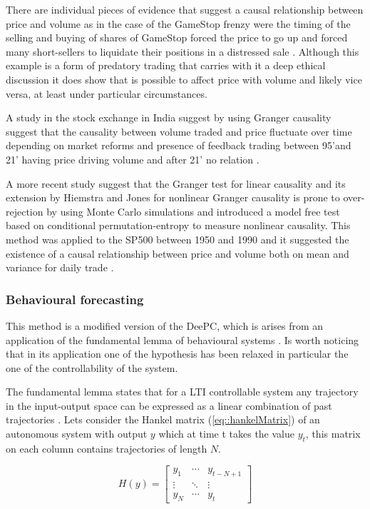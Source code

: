 There are individual pieces of evidence that suggest a causal relationship between price and volume as in the case of the GameStop frenzy were the timing of the selling and buying of shares of GameStop forced the price to go up and forced many short-sellers to liquidate their positions in a distressed sale \cite{game_stop_case}. Although this example is a form of predatory trading that carries with it a deep ethical discussion it does show that is possible to affect price with volume and likely vice versa, at least under particular circumstances.

A study in the stock exchange in India suggest by using Granger causality suggest that the causality between volume traded and price fluctuate over time depending on market reforms and presence of feedback trading between 95'and 21' having price driving volume and after 21' no relation \cite{price_volume_causality_india06}.

A more recent study suggest that the Granger test for linear causality and its extension by Hiemstra and Jones for nonlinear Granger causality is prone to over-rejection by using Monte Carlo simulations and introduced a model free test based on conditional permutation-entropy to measure nonlinear causality. This method was applied to the SP500 between 1950 and 1990 and it suggested the existence of a causal relationship between price and volume both on mean and variance for daily trade \cite{price_volume_causality_enthropy}.

\subsubsection{Behavioural forecasting}
This method is a modified version of the \ac{DeePC}\cite{og_deepc}, which is arises from an application of the fundamental lemma of behavioural systems \cite{precursor_deepc,fundamentalLemma}. Is worth noticing that in its application one of the hypothesis has been relaxed in particular the one of the controllability of the system.

The fundamental lemma states that for a \ac{LTI} controllable system any trajectory in the input-output space can be expressed as a linear combination of past trajectories \cite{fundamentalLemma}. Lets consider the Hankel matrix (\ref{eq::hankelMatrix}) of an autonomous system with output $y$ which at time t takes the value $y_t$, this matrix on each column contains trajectories of length $N$. 

\begin{equation}
    \label{eq::hankelMatrix}
    H(y)= \begin{bmatrix}
y_1 & \cdots & y_{t-N+1}\\
\vdots & \ddots & \vdots\\
y_N & \cdots & y_t
\end{bmatrix}
\end{equation}

